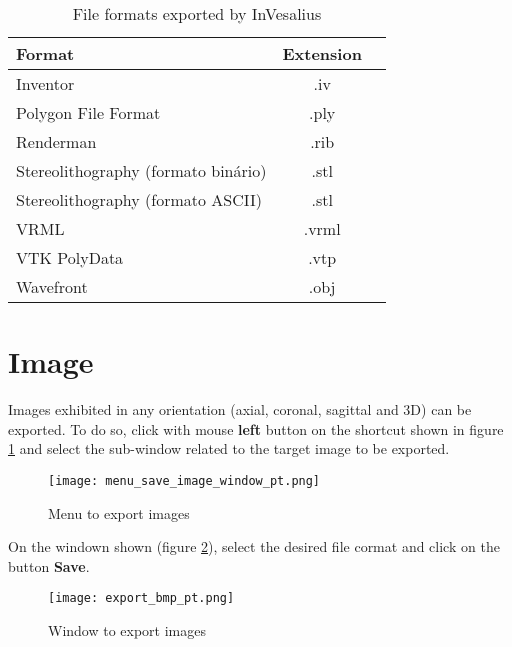 \begin{table}[h]
\centering
\caption{File formats exported by InVesalius}
\begin{tabular}{lcc}\\
\hline %
Format & Extension\\
\hline
\hline
Inventor & .iv\\
Polygon File Format & .ply\\
Renderman & .rib\\
Stereolithography (formato binário)& .stl\\
Stereolithography (formato ASCII) & .stl\\
VRML & .vrml\\
VTK PolyData & .vtp\\
Wavefront & .obj\\
\hline
\end{tabular}
\label{tab:files_export_list}
\end{table} 


\section{Image}

Images exhibited in any orientation (axial, coronal,
sagittal and 3D) can be exported. To do so, click with mouse \textbf{left} button on the shortcut
shown in figure \ref{fig:menu_save_image_window} and select the sub-window related to the target
image to be exported.

\begin{figure}[!htb]
\centering
\texttt{[image: menu\_save\_image\_window\_pt.png]}
\caption{Menu to export images}
\label{fig:menu_save_image_window}
\end{figure}

On the windown shown (figure \ref{fig:save_image_window}), select the desired file cormat and click
on the button \textbf{Save}.

\begin{figure}[!htb]
\centering
\texttt{[image: export\_bmp\_pt.png]}
\caption{Window to export images}
\label{fig:save_image_window}
\end{figure}
